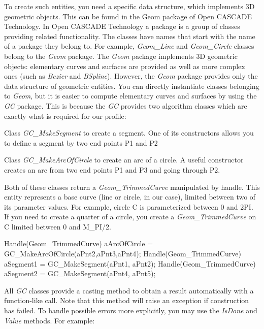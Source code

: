 To create such entities, you need a specific data structure, which implements 3D geometric objects. This can be found in the Geom package of Open C\+A\+S\+C\+A\+DE Technology. In Open C\+A\+S\+C\+A\+DE Technology a package is a group of classes providing related functionality. The classes have names that start with the name of a package they belong to. For example, {\itshape Geom\+\_\+\+Line} and {\itshape Geom\+\_\+\+Circle} classes belong to the {\itshape Geom} package. The {\itshape Geom} package implements 3D geometric objects\+: elementary curves and surfaces are provided as well as more complex ones (such as {\itshape Bezier} and {\itshape B\+Spline}). However, the {\itshape Geom} package provides only the data structure of geometric entities. You can directly instantiate classes belonging to {\itshape Geom}, but it is easier to compute elementary curves and surfaces by using the {\itshape GC} package. This is because the {\itshape GC} provides two algorithm classes which are exactly what is required for our profile\+:


\begin{DoxyItemize}
\item Class {\itshape G\+C\+\_\+\+Make\+Segment} to create a segment. One of its constructors allows you to define a segment by two end points P1 and P2
\item Class {\itshape G\+C\+\_\+\+Make\+Arc\+Of\+Circle} to create an arc of a circle. A useful constructor creates an arc from two end points P1 and P3 and going through P2.
\end{DoxyItemize}

Both of these classes return a {\itshape Geom\+\_\+\+Trimmed\+Curve} manipulated by handle. This entity represents a base curve (line or circle, in our case), limited between two of its parameter values. For example, circle C is parameterized between 0 and 2\+PI. If you need to create a quarter of a circle, you create a {\itshape Geom\+\_\+\+Trimmed\+Curve} on C limited between 0 and M\+\_\+\+P\+I/2.


\begin{DoxyCode}
Handle(Geom\_TrimmedCurve) aArcOfCircle = GC\_MakeArcOfCircle(aPnt2,aPnt3,aPnt4);
Handle(Geom\_TrimmedCurve) aSegment1    = GC\_MakeSegment(aPnt1, aPnt2);
Handle(Geom\_TrimmedCurve) aSegment2    = GC\_MakeSegment(aPnt4, aPnt5);
\end{DoxyCode}


All {\itshape GC} classes provide a casting method to obtain a result automatically with a function-\/like call. Note that this method will raise an exception if construction has failed. To handle possible errors more explicitly, you may use the {\itshape Is\+Done} and {\itshape Value} methods. For example\+:



